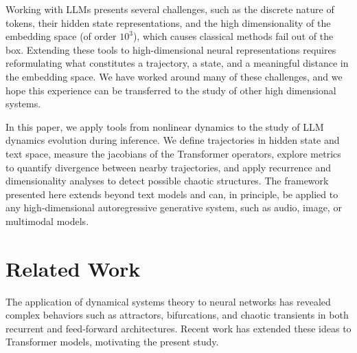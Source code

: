 \documentclass[a4paper,12pt]{article}
\begin{document}
    Working with LLMs presents several challenges, such as the discrete nature of tokens, their hidden state representations, and the high dimensionality of the embedding space (of order $10^3$), which causes classical methods fail out of the box.
    Extending these tools to high-dimensional neural representations requires reformulating what constitutes a trajectory, a state, and a meaningful distance in the embedding space. 
    We have worked around many of these challenges, and we hope this experience can be transferred to the study of other high dimensional systems.

    In this paper, we apply tools from nonlinear dynamics to the study of LLM dynamics evolution during inference. We define trajectories in hidden state and text space, measure the jacobians of the Transformer operators, explore metrics to quantify divergence between nearby trajectories, and apply recurrence and dimensionality analyses to detect possible chaotic structures. The framework presented here extends beyond text models and can, in principle, be applied to any high-dimensional autoregressive generative system, such as audio, image, or multimodal models.


    \section{Related Work} 
    \label{sec:related_work}

    The application of dynamical systems theory to neural networks has revealed complex behaviors such as attractors, bifurcations, and chaotic transients in both recurrent and feed-forward architectures. Recent work has extended these ideas to Transformer models, motivating the present study.
\end{document}
